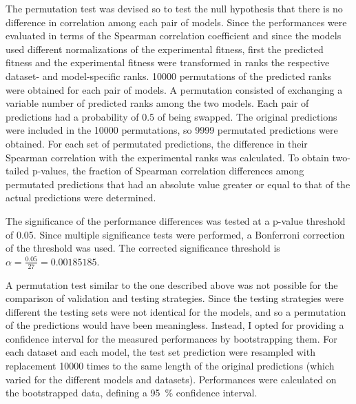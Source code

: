 The permutation test was devised so to test the null hypothesis that there is no difference in correlation among each pair of models.
Since the performances were evaluated in terms of the Spearman correlation coefficient and since the models used different normalizations of the experimental fitness, first the predicted fitness and the experimental fitness were transformed in ranks the respective dataset- and model-specific ranks.
\num{10000} permutations of the predicted ranks were obtained for each pair of models.
A permutation consisted of exchanging a variable number of predicted ranks among the two models.
Each pair of predictions had a probability of 0.5 of being swapped.
The original predictions were included in the \num{10000} permutations, so \num{9999} permutated predictions were obtained.
For each set of permutated predictions, the difference in their Spearman correlation with the experimental ranks was calculated.
To obtain two-tailed p-values, the fraction of Spearman correlation differences among permutated predictions that had an absolute value greater or equal to that of the actual predictions were determined.

The significance of the performance differences was tested at a p-value threshold of \num{0.05}.
Since multiple significance tests were performed, a Bonferroni correction of the threshold was used.
The corrected significance threshold is $\alpha = \frac{0.05}{27} = 0.00185185$.

A permutation test similar to the one described above was not possible for the comparison of validation and testing strategies.
Since the testing strategies were different the testing sets were not identical for the models, and so a permutation of the predictions would have been meaningless.
Instead, I opted for providing a confidence interval for the measured performances by bootstrapping them.
For each dataset and each model, the test set prediction were resampled with replacement \num{10000} times to the same length of the original predictions (which varied for the different models and datasets).
Performances were calculated on the bootstrapped data, defining a \SI{95}{\percent} confidence interval.
